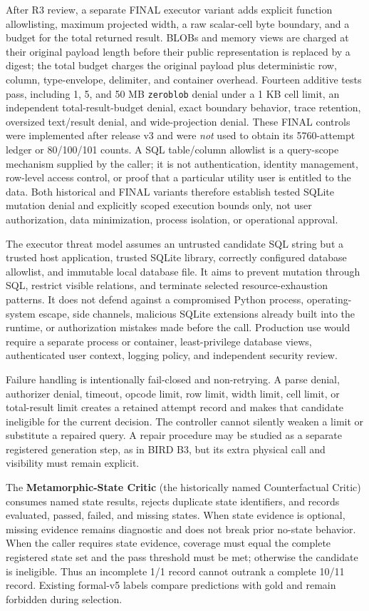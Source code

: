 \documentclass[applsci,article,submit,moreauthors]{Definitions/mdpi}
\begin{document}
After R3 review, a separate FINAL executor variant adds explicit function allowlisting, maximum projected width, a raw scalar-cell byte boundary, and a budget for the total returned result. BLOBs and memory views are charged at their original payload length before their public representation is replaced by a digest; the total budget charges the original payload plus deterministic row, column, type-envelope, delimiter, and container overhead. Fourteen additive tests pass, including 1, 5, and 50 MB \texttt{zeroblob} denial under a 1 KB cell limit, an independent total-result-budget denial, exact boundary behavior, trace retention, oversized text/result denial, and wide-projection denial. These FINAL controls were implemented after release v3 and were \emph{not} used to obtain its 5760-attempt ledger or 80/100/101 counts. A SQL table/column allowlist is a query-scope mechanism supplied by the caller; it is not authentication, identity management, row-level access control, or proof that a particular utility user is entitled to the data. Both historical and FINAL variants therefore establish tested SQLite mutation denial and explicitly scoped execution bounds only, not user authorization, data minimization, process isolation, or operational approval.

The executor threat model assumes an untrusted candidate SQL string but a trusted host application, trusted SQLite library, correctly configured database allowlist, and immutable local database file. It aims to prevent mutation through SQL, restrict visible relations, and terminate selected resource-exhaustion patterns. It does not defend against a compromised Python process, operating-system escape, side channels, malicious SQLite extensions already built into the runtime, or authorization mistakes made before the call. Production use would require a separate process or container, least-privilege database views, authenticated user context, logging policy, and independent security review.

Failure handling is intentionally fail-closed and non-retrying. A parse denial, authorizer denial, timeout, opcode limit, row limit, width limit, cell limit, or total-result limit creates a retained attempt record and makes that candidate ineligible for the current decision. The controller cannot silently weaken a limit or substitute a repaired query. A repair procedure may be studied as a separate registered generation step, as in BIRD B3, but its extra physical call and visibility must remain explicit.

The \textbf{Metamorphic-State Critic} (the historically named Counterfactual Critic) consumes named state results, rejects duplicate state identifiers, and records evaluated, passed, failed, and missing states. When state evidence is optional, missing evidence remains diagnostic and does not break prior no-state behavior. When the caller requires state evidence, coverage must equal the complete registered state set and the pass threshold must be met; otherwise the candidate is ineligible. Thus an incomplete 1/1 record cannot outrank a complete 10/11 record. Existing formal-v5 labels compare predictions with gold and remain forbidden during selection.
\end{document}
